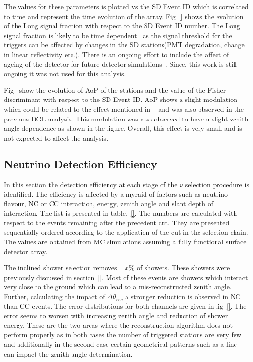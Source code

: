 The values for these parameters is plotted vs the SD Event ID which is correlated to time and represent the time evolution of the array. Fig~\ref{} shows the evolution of the Long signal fraction with respect to the SD Event ID number. The Long signal fraction is likely to be time dependent~\cite{} as the signal threshold for the triggers can be affected by changes in the SD stations(PMT degradation, change in linear reflectivity etc.). There is an ongoing effort to include the affect of ageing of the detector for future detector simulations~\cite{}. Since, this work is still ongoing it was not used for this analysis. 

Fig~\cite{} show the evolution of AoP of the stations and the value of the Fisher discriminant with respect to the SD Event ID. AoP shows a slight modulation which could be related to the effect mentioned in ~\cite{} and was also observed in the previous DGL analysis. This modulation was also observed to have a slight zenith angle dependence as shown in the figure. Overall, this effect is very small and is not expected to affect the analysis.

\subsection{Neutrino Detection Efficiency}
\label{subsec:nu_sel_nudeteff}

In this section the detection efficiency at each stage of the $\nu$ selection procedure is identified. The efficiency is affected by a myraid of factors such as neutrino flavour, NC or CC interaction, energy, zenith angle and slant depth of interaction. The list is presented in table.~\ref{}. The numbers are calculated with respect to the events remaining after the precedent cut. They are presented sequentially ordered according to the application of the cut in the selection chain. The values are obtained from MC simulations assuming a fully functional surface detector array. 

The inclined shower selection removes ~ $x\%$ of showers. These showers were previously discussed in section~\ref{}. Most of these events are showers which interact very close to the ground which can lead to a mis-reconstructed zenith angle. Further, calculating the impact of $\Delta \theta_{rec}$ a stronger reduction is observed in NC than CC events. The error distributions for both channels are given in fig~\ref{}. The error seems to worsen with increasing zenith angle and reduction of shower energy. These are the two areas where the reconstruction algorithm does not perform properly as in both cases the number of triggered stations are very few and additionally in the second case certain geometrical patterns such as a line can impact the zenith angle determination.

